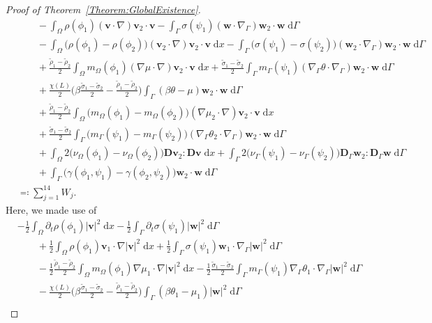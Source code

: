 \documentclass[10pt,reqno]{amsart}
\theoremstyle{remark}
\numberwithin{equation}{section}
\newcommand{\abs}[1]{| #1 |}
\newcommand{\bv}{\mathbf{v}}
\newcommand{\bw}{\mathbf{w}}
\newcommand{\D}{\mathbf{D}}
\newcommand{\Dg}{\mathbf{D}_\Gamma}
\newcommand{\intO}{\int_\Omega}
\newcommand{\intG}{\int_\Gamma}
\newcommand{\dx}{\;\mathrm{d}x}
\newcommand{\dG}{\;\mathrm d\Ga}
\newcommand{\delt}{\partial_{t}}
\newcommand{\Grad}{\nabla}
\newcommand{\Gradg}{\nabla_\Ga}
\newcommand{\Om}{\Omega}
\newcommand{\Ga}{\Gamma}
\begin{document}
\begin{proof}[Proof of Theorem~\ref{Theorem:GlobalExistence}]
\begin{align}
    &\qquad - \intO \rho(\phi_1)(\bv\cdot\Grad)\bv_2\cdot\bv - \intG \sigma(\psi_1)(\bw\cdot\Gradg)\bw_2\cdot\bw\dG \nonumber \\
    &\qquad - \intO \big(\rho(\phi_1) - \rho(\phi_2)\big)(\bv_2\cdot\Grad)\bv_2\cdot\bv\dx - \intG \big(\sigma(\psi_1) - \sigma(\psi_2)\big)(\bw_2\cdot\Gradg)\bw_2\cdot\bw\dG \nonumber \\
    &\qquad + \frac{\tilde\rho_1 - \tilde\rho_2}{2}\intO m_\Om(\phi_1)(\Grad\mu\cdot\Grad)\bv_2\cdot\bv\dx + \frac{\tilde\sigma_1 - \tilde\sigma_2}{2}\intG m_\Ga(\psi_1)(\Gradg\theta\cdot\Gradg)\bw_2\cdot\bw\dG \nonumber \\
    &\qquad + \frac{\chi(L)}{2}\Big(\beta\frac{\tilde\sigma_1 - \tilde\sigma_2}{2} - \frac{\tilde\rho_1 - \tilde\rho_2}{2}\Big)\intG (\beta\theta - \mu)\bw_2\cdot\bw\dG \\ 
    &\qquad + \frac{\tilde\rho_1 - \tilde\rho_2}{2}\intO \big(m_\Om(\phi_1) - m_\Om(\phi_2)\big)(\Grad\mu_2\cdot\Grad)\bv_2\cdot\bv\dx \nonumber \\
    &\qquad + \frac{\tilde\sigma_1 - \tilde\sigma_2}{2}\intG \big(m_\Ga(\psi_1) - m_\Ga(\psi_2)\big)(\Gradg\theta_2\cdot\Gradg)\bw_2\cdot\bw\dG \nonumber \\
    &\qquad + \intO 2\big(\nu_\Om(\phi_1) - \nu_\Om(\phi_2)\big)\D\bv_2:\D\bv\dx + \intG 2\big(\nu_\Ga(\psi_1) - \nu_\Ga(\psi_2)\big)\Dg\bw_2:\Dg\bw\dG \nonumber \\
    &\qquad + \intG \big(\gamma(\phi_1,\psi_1) - \gamma(\phi_2,\psi_2)\big)\bw_2\cdot\bw\dG \nonumber \\
    &\eqqcolon \sum_{j=1}^{14} W_j. \nonumber
\end{align}
Here, we made use of
\begin{align*}
    &-\frac12\intO \delt\rho(\phi_1)\abs{\bv}^2\dx - \frac12\intG \delt\sigma(\psi_1)\abs{\bw}^2\dG \nonumber \\
    &\qquad + \frac12\intO \rho(\phi_1)\bv_1\cdot\Grad\abs{\bv}^2\dx + \frac12\intG \sigma(\psi_1)\bw_1\cdot\Gradg\abs{\bw}^2\dG \nonumber \\
    &\qquad - \frac12\frac{\tilde\rho_1 - \tilde\rho_2}{2}\intO m_\Om(\phi_1)\Grad\mu_1\cdot\Grad\abs{\bv}^2\dx - \frac12\frac{\tilde\sigma_1 - \tilde\sigma_2}{2}\intG m_\Ga(\psi_1)\Gradg\theta_1\cdot\Gradg\abs{\bw}^2\dG \\
    &\qquad - \frac{\chi(L)}{2}\Big(\beta\frac{\tilde\sigma_1 - \tilde\sigma_2}{2} - \frac{\tilde\rho_1 - \tilde\rho_2}{2}\Big)\intG (\beta\theta_1 - \mu_1)\abs{\bw}^2\dG \nonumber \\

\end{align*}
\end{proof}
\end{document}
